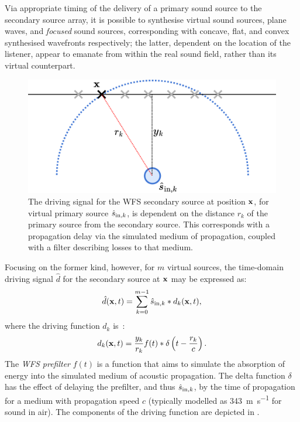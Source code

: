 Via appropriate timing of the delivery of a primary sound source to the
secondary source array, it is possible to synthesise virtual sound sources,
plane waves, and \textit{focused} sound sources, corresponding with concave,
flat, and convex synthesised wavefronts respectively; the latter, dependent
on the location of the listener, appear to emanate from within the real
sound field, rather than its virtual counterpart.

\begin{figure}[ht]
    \centering
    \includegraphics[width=.75\textwidth]{figures/wfs_2}
    \caption{
        The driving signal for the WFS secondary source at position $\mathbf{x}$,
        for virtual primary source $\hat{s}_{\text{in},k}$, is dependent on the distance
        $r_k$ of the primary source from the secondary source.
        This corresponds with a propagation delay via the simulated medium of
        propagation, coupled with a filter describing losses to that medium.
    }
    \label{fig:wfs_2}
\end{figure}

Focusing on the former kind, however, for $m$ virtual sources, the time-domain
driving signal $\hat{d}$ for the secondary source at $\mathbf{x}$ may be expressed
as:
\begin{equation}
    \label{eq:driving-signal}
    \hat{d}(\mathbf{x},t) = \sum_{k=0}^{m-1}\hat{s}_{\text{in},k} \ast d_k(\mathbf{x},t),
\end{equation}
where the driving function $d_k$ is~\citep{ahrens_analytic_2012}:
\begin{equation}
    \label{eq:driving-function}
    d_k(\mathbf{x},t) = \frac{y_k}{r_k}f(t) \ast \delta\left(t - \frac{r_k}{c}\right).
\end{equation}
The \textit{WFS prefilter} $f(t)$ is a function that aims to simulate the
absorption of energy into the simulated medium of acoustic propagation.
The delta function $\delta$ has the effect of delaying the prefilter, and thus
$\hat{s}_{\text{in},k}$, by the time of propagation for a medium with propagation speed $c$
(typically modelled as \qty[per-mode=symbol]{343}{\m\per\s} for sound in air).
The components of the driving function are depicted in .
